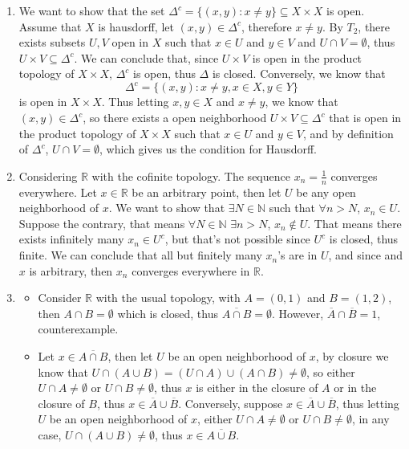 \documentclass[12pt]{article}
\begin{document}
\begin{enumerate}
\begin{itemize}
		\end{itemize}
	\item We want to show that the set $\Delta^c = \{(x,y) \colon x \neq y\} \subseteq X \times X$ is open. Assume that $X$ is hausdorff, let $(x,y) \in \Delta^c$, therefore $x \neq y$. By $T_2$, there exists subsets $U,V$ open in $X$ such that $x \in U$ and $y \in V$ and $U \cap V = \emptyset$, thus $U \times V \subseteq \Delta^c$. We can conclude that, since $U \times V$ is open in the product topology of $X \times X$, $\Delta^c$ is open, thus $\Delta$ is closed. Conversely, we know that $$\Delta^c = \{(x,y) \colon x\neq y, x \in X, y \in Y\}$$ is open in $X \times X$. Thus letting $x,y \in X$ and $x \neq y$, we know that $(x,y) \in \Delta^c$, so there exists a open neighborhood $U \times V \subseteq \Delta^c$ that is open in the product topology of $X \times X$ such that $x \in U$ and $y \in V$, and by definition of $\Delta^c$, $U \cap V = \emptyset$, which gives us the condition for Hausdorff. 
	\item Considering $\mathbb{R}$ with the cofinite topology. The sequence $x_n = \frac{1}{n}$ converges everywhere. Let $x \in \mathbb{R}$ be an arbitrary point, then let $U$ be any open neighborhood of $x$. We want to show that $\exists N \in \mathbb{N}$ such that $\forall n >N$, $x_n \in U$. Suppose the contrary, that means $\forall N \in \mathbb{N}$ $\exists n > N$, $x_n \notin U$. That means there exists infinitely many $x_n \in U^c$, but that's not possible since $U^c$ is closed, thus finite. We can conclude that all but finitely many $x_n$'s are in $U$, and since and $x$ is arbitrary, then $x_n$ converges everywhere in $\mathbb{R}$. 
	\item 
		\begin{itemize}
			\item[(a)] Consider $\mathbb{R}$ with the usual topology, with $A = (0,1)$ and $B = (1,2)$, then $A \cap B = \emptyset$ which is closed, thus $\overline{A \cap B} = \emptyset$. However, $\overline{A} \cap \overline{B} = 1$, counterexample.
			\item[(b)] Let $x \in \overline{A \cap B}$, then let $U$ be an open neighborhood of $x$, by closure we know that $U \cap (A \cup B) = (U\cap A) \cup (A \cap B) \neq \emptyset$, so either $U \cap A \neq \emptyset$ or $U \cap B \neq \emptyset$, thus $x$ is either in the closure of $A$ or in the closure of $B$, thus $x \in \overline{A} \cup \overline{B}$. Conversely, suppose $x \in \overline{A} \cup \overline{B}$, thus letting $U$ be an open neighborhood of $x$, either $U \cap A \neq \emptyset$ or $U \cap B \neq \emptyset$, in any case, $U \cap (A\cup B) \neq \emptyset$, thus $x \in \overline{A \cup B}$. 

\end{itemize}
\end{enumerate}
\end{document}
